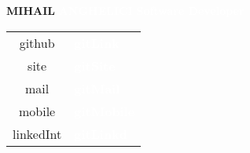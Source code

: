 \documentclass{article}
\begin{document}
	
	\begin{titlepage}
		\BgThispage
		\vspace*{-2cm}
		\noindent
			\vspace{2cm}
		\begin{minipage}{0.5\textwidth}
			\begin{flushleft}
					\textcolor{lightorange}{\huge\selectfont\bfseries MIHAIL}
					\textcolor{white}{\huge\selectfont\bfseries ANGHELICI} \newline
					\textcolor{white}{\Large\selectfont\bfseries Software Developer }
			\end{flushleft}
		\end{minipage}
		\hfill%
		\begin{minipage}{0.3\textwidth}
		\begin{flushright}
			\large\selectfont
			\begin{tabular}{ c l }
				github & \textcolor{white}{\large\selectfont\bfseries gitLink} \\ 
				site & \textcolor{white}{\large\selectfont\bfseries gitSite}\\  
				mail & \textcolor{white}{\large\selectfont\bfseries gitMail} \\
				mobile & \textcolor{white}{\large\selectfont\bfseries gitMobile}\\
				linkedInt & \textcolor{white}{\large\selectfont\bfseries gitLinkd } 
			\end{tabular} 
		\end{flushright}
	\end{minipage} 
		\vspace{-1.3cm}

\end{titlepage}
\end{document}

